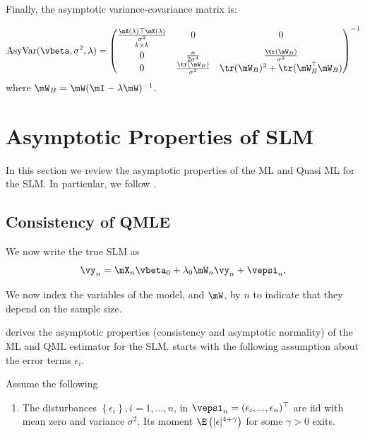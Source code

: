 \documentclass[english,12pt]{book}\usepackage[]{graphicx}\usepackage[]{xcolor}
\begin{document}
Finally, the asymptotic variance-covariance matrix is:

\begin{equation}\label{eq:asyvar_sem}
\mbox{AsyVar}(\vbeta, \sigma^2, \lambda)  = 
\begin{pmatrix}
 \underset{k \times k}{\frac{\mX(\lambda)\top\mX(\lambda)}{\sigma^2}} & 0 & 0 \\
  0 & \frac{n}{2\sigma^4} & \frac{\tr(\mW_B)}{\sigma^2} \\
 0 & \frac{\tr(\mW_B)}{\sigma^2} & \tr(\mW_B)^2 + \tr(\mW_B^\top\mW_B)
\end{pmatrix}^{-1}
\end{equation}
%
where $\mW_B = \mW(\mI - \lambda\mW)^{-1}$.

\section{Asymptotic Properties of SLM}

In this section we review the asymptotic properties of the ML and Quasi ML for the SLM. In particular, we follow \cite{lee2004asymptotic}.

\subsection{Consistency of QMLE}

We now write the true SLM as
\begin{equation*}
\vy_n = \mX_n\vbeta_0 + \lambda_0\mW_n\vy_n + \vepsi_n,
\end{equation*}

We now index the variables of the model, and $\mW$, by $n$ to indicate that they depend on the sample size. 

\cite{lee2004asymptotic} derives the asymptotic properties (consistency and asymptotic normality) of the ML and QML estimator for the SLM. \cite{lee2004asymptotic} starts with the following assumption about the error terms $\epsilon_{i}$. 

\begin{assumption}\label{assu:ml_1}
Assume the following
  \begin{enumerate}
    \item The disturbances $\left\lbrace \epsilon_{i}\right\rbrace, i = 1, ..., n$, in $\vepsi_n = (\epsilon_i, ..., \epsilon_n)^\top$ are iid with mean zero and variance $\sigma^2$. Its moment $\E\left(|\epsilon|^{4 + \gamma}\right)$ for some $\gamma > 0$ exits.
  \end{enumerate}  
\end{assumption}
\end{document}
